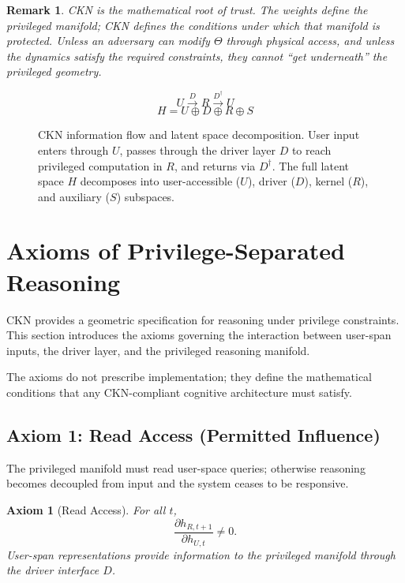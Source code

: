 \documentclass[11pt,a4paper]{article}
\newtheorem{axiom}{Axiom}
\newtheorem*{remark}{Remark}
\begin{document}
\begin{remark}
CKN is the mathematical root of trust. The weights define the privileged manifold; CKN defines the conditions under which that manifold is protected. Unless an adversary can modify $\Theta$ through physical access, and unless the dynamics satisfy the required constraints, they cannot ``get underneath'' the privileged geometry.
\end{remark}

\begin{figure}[h]
\centering
\[
U \xrightarrow{D} R \xrightarrow{D^\dagger} U
\]
\[
H = U \oplus D \oplus R \oplus S
\]
\caption{CKN information flow and latent space decomposition. User input enters through $U$, passes through the driver layer $D$ to reach privileged computation in $R$, and returns via $D^\dagger$. The full latent space $H$ decomposes into user-accessible ($U$), driver ($D$), kernel ($R$), and auxiliary ($S$) subspaces.}
\end{figure}

\section{Axioms of Privilege-Separated Reasoning}

CKN provides a geometric specification for reasoning under privilege constraints. This section introduces the axioms governing the interaction between user-span inputs, the driver layer, and the privileged reasoning manifold.

The axioms do not prescribe implementation; they define the mathematical conditions that any CKN-compliant cognitive architecture must satisfy.

\subsection{Axiom 1: Read Access (Permitted Influence)}

The privileged manifold must read user-space queries; otherwise reasoning becomes decoupled from input and the system ceases to be responsive.

\begin{axiom}[Read Access]
For all $t$,
\begin{equation}
\frac{\partial h_{R,t+1}}{\partial h_{U,t}} \neq 0.
\end{equation}
User-span representations provide information to the privileged manifold through the driver interface $D$.
\end{axiom}
\end{document}
